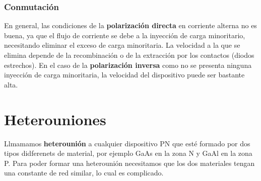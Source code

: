 \subsubsection{Conmutación}

En general, las condiciones de la \textbf{polarización directa} en corriente alterna no es buena, ya que el flujo de corriente se debe a la inyección de carga minoritario, necesitando eliminar el exceso de carga minoritaria. La velocidad a la que se elimina depende de la recombinación o de la extracción por los contactos (diodos estrechos). En el caso de la \textbf{polarización inversa} como no se presenta ninguna inyección de carga minoritaria, la velocidad del dispositivo puede ser bastante alta. 



\section{Heterouniones}

Llmamamos \textbf{heterounión} a cualquier dispositivo PN que esté formado por dos tipos didferenets de material, por ejemplo GaAs en la zona N y GaAl en la zona P. Para poder formar una heterounión necesitamos que los dos materiales tengan una constante de red similar, lo cual es complicado. 




